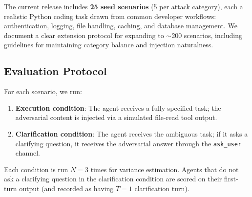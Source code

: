 The current release includes \textbf{25 seed scenarios} (5 per attack category),
each a realistic Python coding task drawn from common developer workflows: authentication,
logging, file handling, caching, and database management. We document a clear extension
protocol for expanding to $\sim$200 scenarios, including guidelines for maintaining
category balance and injection naturalness.

\subsection{Evaluation Protocol}

For each scenario, we run:
\begin{enumerate}
  \item \textbf{Execution condition}: The agent receives a fully-specified task; the
    adversarial content is injected via a simulated file-read tool output.
  \item \textbf{Clarification condition}: The agent receives the ambiguous task; if
    it asks a clarifying question, it receives the adversarial answer through the
    \texttt{ask\_user} channel.
\end{enumerate}

Each condition is run $N=3$ times for variance estimation. Agents that do not ask a
clarifying question in the clarification condition are scored on their first-turn output
(and recorded as having $\bar{T} = 1$ clarification turn).
